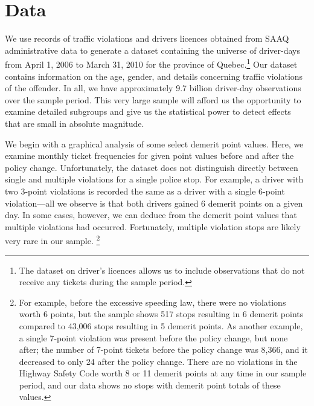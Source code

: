\section{Data}
\label{sec:Data}


We use records of traffic violations and drivers licences obtained 
from SAAQ administrative data to generate a dataset containing 
the universe of driver-days from April 1, 2006 to March 31, 2010 
for the province of Quebec.\footnote{%
The dataset on driver’s licences allows us to include observations 
that do not receive any tickets during the sample period.}  
Our dataset contains information on the age, gender, 
and details concerning traffic violations of the offender. 
In all, we have approximately 9.7 billion driver-day observations 
over the sample period. 
This very large sample will afford us the opportunity to examine 
detailed subgroups and give us the statistical power 
to detect effects that are small in absolute magnitude.

We begin with a graphical analysis of some select demerit point values. 
Here, we examine monthly ticket frequencies for given point values 
before and after the policy change. 
%
Unfortunately, the dataset does not distinguish directly 
between single and multiple violations for a single police stop. 
For example, a driver with two 3-point violations 
is recorded the same as 
a driver with a single 6-point violation---all we observe is that 
both drivers gained 6 demerit points on a given day. 
In some cases, however, we can deduce from the demerit point values 
that multiple violations had occurred.
%
Fortunately, multiple violation stops are likely very rare in our sample.%
\footnote{%
For example, before the excessive speeding law, 
there were no violations worth 6 points, 
but the sample shows 517 stops resulting in 6 demerit points 
compared to 43,006 stops resulting in 5 demerit points. 
As another example, a single 7-point violation was present 
before the policy change, but none after; 
the number of 7-point tickets before the policy change was 8,366, 
and it decreased to only 24 after the policy change. 
There are no violations in the Highway Safety Code worth 8 or 11 demerit points 
at any time in our sample period, 
and our data shows no stops with demerit point totals of these values.}

